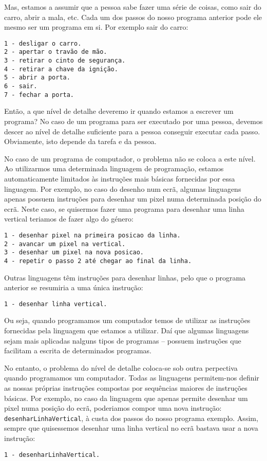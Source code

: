 Mas, estamos a assumir que a pessoa sabe fazer uma série de coisas, como sair do carro, abrir a mala, etc.
Cada um dos passos do nosso programa anterior pode ele mesmo ser um programa em si. Por exemplo sair do carro:
\begin{verbatim}
1 - desligar o carro.
2 - apertar o travão de mão.
3 - retirar o cinto de segurança.
4 - retirar a chave da ignição.
5 - abrir a porta.
6 - sair.
7 - fechar a porta.
\end{verbatim}

Então, a que nível de detalhe deveremo ir quando estamos a escrever um programa? No caso de um programa para ser executado por uma pessoa, devemos descer ao nível de detalhe suficiente para a pessoa conseguir executar cada passo. Obviamente, isto depende da tarefa e da pessoa.

No caso de um programa de computador, o problema não se coloca a este nível. Ao utilizarmos uma determinada linguagem de programação, estamos automaticamente limitados às instruções mais básicas fornecidas por essa linguagem. Por exemplo, no caso do desenho num ecrã, algumas linguagens apenas possuem instruções para desenhar um pixel numa determinada posição do ecrã. Neste caso, se quisermos fazer uma programa para desenhar uma linha vertical teriamos de fazer algo do género:
\begin{verbatim}
1 - desenhar pixel na primeira posicao da linha.
2 - avancar um pixel na vertical.
3 - desenhar um pixel na nova posicao.
4 - repetir o passo 2 até chegar ao final da linha.
\end{verbatim}

Outras linguagens têm instruções para desenhar linhas, pelo que o programa anterior se resumiria a uma única instrução:
\begin{verbatim}
1 - desenhar linha vertical.
\end{verbatim}

Ou seja, quando programamos um computador temos de utilizar as instruções fornecidas pela linguagem que estamos a utilizar. Daí que algumas linguagens sejam mais aplicadas nalguns tipos de programas -- possuem instruções que facilitam a escrita de determinados programas.

No entanto, o problema do nível de detalhe coloca-se sob outra perpectiva quando programamos um computador. Todas as linguagens permitem-nos definir as nossas próprias instruções compostas por sequências maiores de instruções básicas. Por exemplo, no caso da linguagem que apenas permite desenhar um pixel numa posição do ecrã, poderiamos compor uma nova instrução: \texttt{desenharLinhaVertical}, à custa dos passos do nosso programa exemplo. Assim, sempre que quisessemos desenhar uma linha vertical no ecrã bastava usar a nova instrução:
\begin{verbatim}
1 - desenharLinhaVertical.
\end{verbatim}

